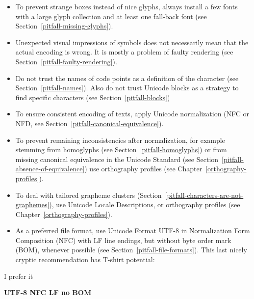 \begin{itemize}
   \item To prevent strange boxes instead of nice glyphs, always install a few
         fonts with a large glyph collection and at least one fall-back font
         (see Section~\ref{pitfall-missing-glyphs}).
   \item Unexpected visual impressions of symbols does not necessarily mean that
         the actual encoding is wrong. It is mostly a problem of faulty
         rendering (see Section~\ref{pitfall-faulty-rendering}).
   \item Do not trust the names of code points as a definition of the character
         (see Section~\ref{pitfall-names}). Also do not trust Unicode blocks as
         a strategy to find specific characters (see
         Section~\ref{pitfall-blocks})
   \item To ensure consistent encoding of texts, apply Unicode normalization
         (NFC or NFD, see Section~\ref{pitfall-canonical-equivalence}).
   \item To prevent remaining inconsistencies after normalization, for example 
         stemming from homoglyphs (see Section~\ref{pitfall-homoglyphs}) 
         or from missing canonical equivalence in the Unicode Standard
         (see Section~\ref{pitfall-absence-of-equivalence})
         use orthography profiles (see Chapter~\ref{orthography-profiles}).
   \item To deal with tailored grapheme clusters
         (Section~\ref{pitfall-characters-are-not-graphemes}), use Unicode Locale 
         Descriptions, or orthography profiles 
         (see Chapter~\ref{orthography-profiles}).
   \item As a preferred file format, use Unicode Format UTF-8 in 
         Normalization Form Composition (NFC) with LF line endings, 
         but without byte order mark (BOM), whenever possible (see 
         Section~\ref{pitfall-file-formats}). This last nicely cryptic 
         recommendation has T-shirt potential:
  
\end{itemize}

\begin{center}
  I prefer it
  
  \textbf{UTF-8 NFC LF no BOM}
\end{center}


